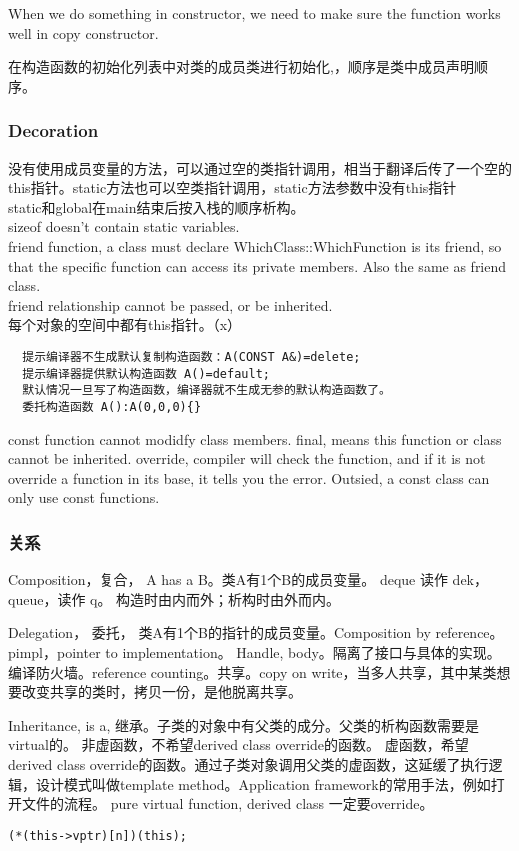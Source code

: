 \documentclass[UTF8]{../computerUniverse}
\begin{document}
When we do something in constructor, we need to make sure the function works well in copy constructor.

在构造函数的初始化列表中对类的成员类进行初始化,，顺序是类中成员声明顺序。

\subsubsection{Decoration}
没有使用成员变量的方法，可以通过空的类指针调用，相当于翻译后传了一个空的this指针。static方法也可以空类指针调用，static方法参数中没有this指针 \\
static和global在main结束后按入栈的顺序析构。\\
sizeof doesn't contain static variables.\\
friend function, a class must declare WhichClass::WhichFunction is its friend, so that the specific function can access its private members. Also the same as friend class.\\
friend relationship cannot be passed, or be inherited.\\
每个对象的空间中都有this指针。（x）\\

\begin{lstlisting}
  提示编译器不生成默认复制构造函数：A(CONST A&)=delete;
  提示编译器提供默认构造函数 A()=default;
  默认情况一旦写了构造函数，编译器就不生成无参的默认构造函数了。
  委托构造函数 A():A(0,0,0){}
\end{lstlisting}

const function cannot modidfy class members. 
final, means this function or class cannot be inherited.
override, compiler will check the function, and if it is not override a function in its base, it tells you the error.
Outsied, a const class can only use const functions.



\subsubsection{关系}
Composition，复合， A has a B。类A有1个B的成员变量。
deque 读作 dek， queue，读作 q。
构造时由内而外；析构时由外而内。

Delegation， 委托， 类A有1个B的指针的成员变量。Composition by reference。pimpl，pointer to implementation。 Handle, body。隔离了接口与具体的实现。编译防火墙。reference counting。共享。copy on write，当多人共享，其中某类想要改变共享的类时，拷贝一份，是他脱离共享。

Inheritance, is a, 继承。子类的对象中有父类的成分。父类的析构函数需要是virtual的。
非虚函数，不希望derived class override的函数。
虚函数，希望derived class override的函数。通过子类对象调用父类的虚函数，这延缓了执行逻辑，设计模式叫做template method。Application framework的常用手法，例如打开文件的流程。
pure virtual function, derived class 一定要override。
\begin{lstlisting}
(*(this->vptr)[n])(this);

\end{lstlisting}
\end{document}
